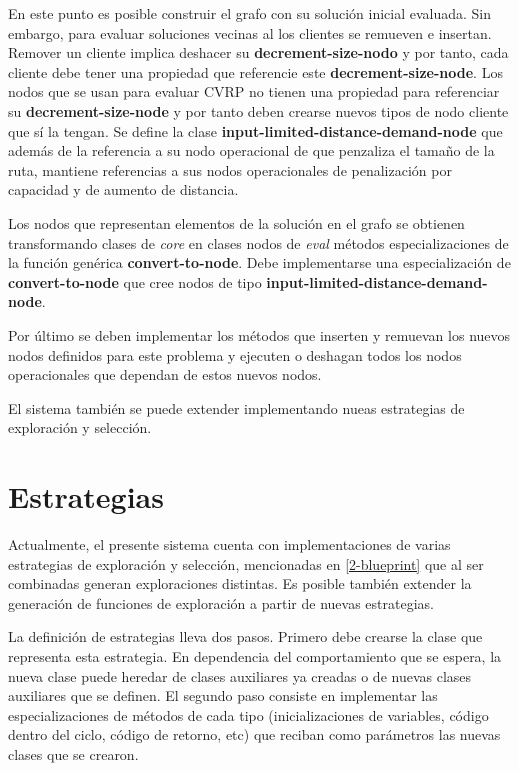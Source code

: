 En este punto es posible construir el grafo con su solución inicial evaluada. Sin embargo, para evaluar soluciones vecinas al los clientes se remueven e insertan. Remover un cliente implica deshacer su \textbf{decrement-size-nodo} y por tanto, cada cliente debe tener una propiedad que referencie este \textbf{decrement-size-node}. Los nodos que se usan para evaluar CVRP no tienen una propiedad para referenciar su \textbf{decrement-size-node} y por tanto deben crearse nuevos tipos de nodo cliente que sí la tengan. Se define la clase \textbf{input-limited-distance-demand-node} que además de la referencia a su nodo operacional de que penzaliza el tamaño de la ruta, mantiene referencias a sus nodos operacionales de penalización por capacidad y de aumento de distancia.

Los nodos que representan elementos de la solución en el grafo se obtienen transformando clases de \textit{core} en clases nodos de \textit{eval} métodos especializaciones de la función genérica \textbf{convert-to-node}. Debe implementarse una especialización de \textbf{convert-to-node} que cree nodos de tipo \textbf{input-limited-distance-demand-node}.

Por último se deben implementar los métodos que inserten y remuevan los nuevos nodos definidos para este problema y ejecuten o deshagan todos los nodos operacionales que dependan de estos nuevos nodos.


El sistema también se puede extender implementando nueas estrategias de exploración y selección.


\section{Estrategias}\label{4-generator}
Actualmente, el presente sistema cuenta con implementaciones de varias estrategias de exploración y selección, mencionadas en \ref{2-blueprint} que al ser combinadas generan exploraciones distintas. Es posible también extender la generación de funciones de exploración a partir de nuevas estrategias.

La definición de estrategias lleva dos pasos. Primero debe crearse la clase que representa esta estrategia. En dependencia del comportamiento que se espera, la nueva clase puede heredar de clases auxiliares ya creadas o de nuevas clases auxiliares que se definen. El segundo paso consiste en implementar las especializaciones de métodos de cada tipo (inicializaciones de variables, código dentro del ciclo, código de retorno, etc) que reciban como parámetros las nuevas clases que se crearon.


